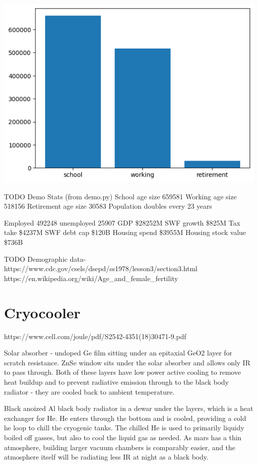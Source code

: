 \documentclass[10pt]{article}
\begin{document}
\includegraphics{fig_demo.png}

TODO Demo Stats (from demo.py)
School age size 659581
Working age size 518156
Retirement age size 30583
Population doubles every 23 years

Employed 492248 unemployed 25907
GDP \$28252M
SWF growth \$825M
Tax take \$4237M
SWF debt cap \$120B
Housing spend \$3955M
Housing stock value \$736B

TODO Demographic data-
https://www.cdc.gov/csels/dsepd/ss1978/lesson3/section3.html
https://en.wikipedia.org/wiki/Age_and_female_fertility

\section{Cryocooler}
https://www.cell.com/joule/pdf/S2542-4351(18)30471-9.pdf

Solar absorber - undoped Ge film sitting under an epitaxial GeO2 layer for scratch resistance.
ZnSe window sits under the solar absorber and allows only IR to pass through.
Both of these layers have low power active cooling to remove heat buildup and to prevent radiative emission through to the black body radiator - they are cooled back to ambient temperature.

Black anoized Al black body radiator in a dewar under the layers, which is a heat exchanger for He. He enters through the bottom and is cooled, providing a cold he loop to chill the cryogenic tanks. The chilled He is used to primarily liquidy boiled off gasses, but also to cool the liquid gas as needed. As mars has a thin atmosphere, building larger vacuum chambers is comparably easier, and the atmosphere itself will be radiating less IR at night as a black body.
\end{document}
